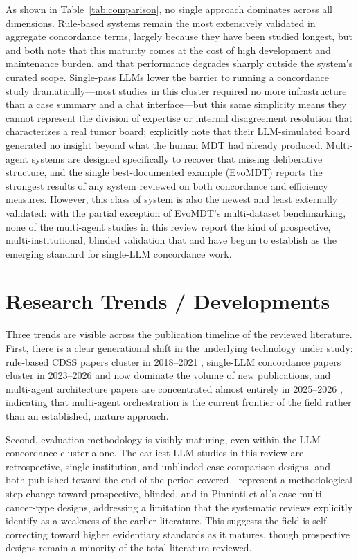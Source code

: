 \documentclass{article}
\begin{document}
As shown in Table~\ref{tab:comparison}, no single approach dominates across all dimensions. Rule-based systems remain the most extensively validated in aggregate concordance terms, largely because they have been studied longest, but \citet{wu2026} and \citet{oehring2023} both note that this maturity comes at the cost of high development and maintenance burden, and that performance degrades sharply outside the system's curated scope. Single-pass LLMs lower the barrier to running a concordance study dramatically---most studies in this cluster required no more infrastructure than a case summary and a chat interface---but this same simplicity means they cannot represent the division of expertise or internal disagreement resolution that characterizes a real tumor board; \citet{ismayilov2025} explicitly note that their LLM-simulated board generated no insight beyond what the human MDT had already produced. Multi-agent systems are designed specifically to recover that missing deliberative structure, and the single best-documented example (EvoMDT) reports the strongest results of any system reviewed on both concordance and efficiency measures. However, this class of system is also the newest and least externally validated: with the partial exception of EvoMDT's multi-dataset benchmarking, none of the multi-agent studies in this review report the kind of prospective, multi-institutional, blinded validation that \citet{pinninti2026} and \citet{seshachalam2026} have begun to establish as the emerging standard for single-LLM concordance work.

\section{Research Trends / Developments}
\label{sec:trends}

Three trends are visible across the publication timeline of the reviewed literature. First, there is a clear generational shift in the underlying technology under study: rule-based CDSS papers cluster in 2018--2021 \cite{somashekhar2018,jie2021}, single-LLM concordance papers cluster in 2023--2026 and now dominate the volume of new publications, and multi-agent architecture papers are concentrated almost entirely in 2025--2026 \cite{liu2026,han2025,saenz2026,wang2025jco}, indicating that multi-agent orchestration is the current frontier of the field rather than an established, mature approach.

Second, evaluation methodology is visibly maturing, even within the LLM-concordance cluster alone. The earliest LLM studies in this review are retrospective, single-institution, and unblinded case-comparison designs. \citet{pinninti2026} and \citet{seshachalam2026}---both published toward the end of the period covered---represent a methodological step change toward prospective, blinded, and in Pinninti et al.'s case multi-cancer-type designs, addressing a limitation that the systematic reviews \cite{carl2024,wu2026} explicitly identify as a weakness of the earlier literature. This suggests the field is self-correcting toward higher evidentiary standards as it matures, though prospective designs remain a minority of the total literature reviewed.
\end{document}
